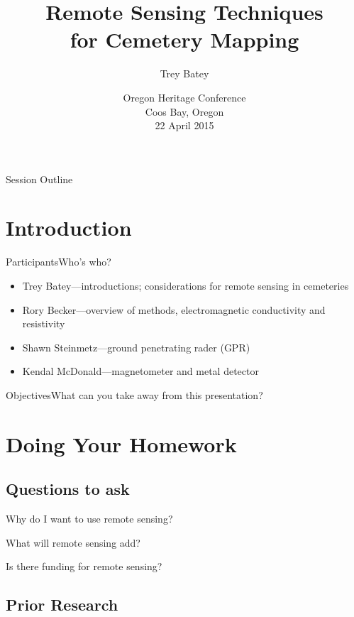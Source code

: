 \documentclass[11pt]{beamer}
\author{Trey Batey}
\title[Remote Sensing Cemeteries]{Remote Sensing Techniques\\for Cemetery Mapping}
\institute{Oregon Commission on Historic Cemeteries}
\date[OHC 2015]{Oregon Heritage Conference\\Coos Bay, Oregon\\22 April 2015}
\begin{document}
\begin{frame}
\titlepage
\end{frame}

\begin{frame}{Session Outline}
\tableofcontents[pausesections]
\end{frame}


\section{Introduction}
\begin{frame}{Participants}{Who's who?}
\begin{itemize}
	\item Trey Batey---introductions; considerations for remote sensing in cemeteries
	\item Rory Becker---overview of methods, electromagnetic conductivity and resistivity
	\item Shawn Steinmetz---ground penetrating rader (GPR)
	\item Kendal McDonald---magnetometer and metal detector
\end{itemize}
\end{frame}

\begin{frame}{Objectives}{What can you take away from this presentation?}
\end{frame}


\section{Doing Your Homework}
\subsection{Questions to ask}
\begin{frame}{Why do I want to use remote sensing?}

\end{frame}

\begin{frame}{What will remote sensing add?}

\end{frame}

\begin{frame}{Is there funding for remote sensing?}

\end{frame}

\subsection{Prior Research}
\begin{frame}

\end{frame}
\end{document}
